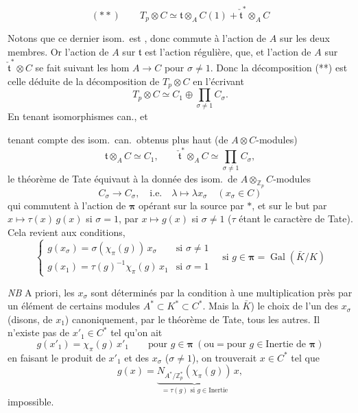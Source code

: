 \documentclass[11pt,a4paper]{article}
\begin{document}
\[
(**) \qquad T_p \otimes C \simeq \mathfrak{t} \otimes_A C(1) + \check{\mathfrak{t}}^{*} \otimes_A C
\]

Notons que ce dernier isom.\ est , donc commute à
l'action de $A$ sur les deux membres. Or l'action de $A$ sur $\mathfrak{t}$
est l'action régulière,  \ill{} \ill{} que, et l'action de
$A$ sur $\check{\mathfrak{t}}^{*} \otimes C$ se fait suivant les hom
$A \to C$ pour $\sigma \neq 1$. Donc la décomposition (**) est celle
déduite de la décomposition de $T_p \otimes C$ \struck{\ill{} \ill{}} en
l'écrivant
\[
T_p \otimes C \simeq C_1 \oplus \prod_{\sigma \neq 1} C_\sigma .
\]
 En tenant   isomorphismes
can., et


tenant compte des isom.\ can.\ obtenus plus haut (de $A \otimes C$-modules)
\[
\mathfrak{t} \otimes_A C \simeq C_1, \qquad
\check{\mathfrak{t}}^{*} \otimes_A C \simeq \prod_{\sigma \neq 1} C_\sigma,
\]
 le théorème de Tate équivaut à la donnée des
isom.\ de $A \otimes_{\mathbb{Z}_p} C$-modules
\[
C_\sigma \to C_\sigma, \quad \text{i.e.} \quad \lambda \mapsto \lambda x_\sigma \quad (x_\sigma \in C)
\]
qui commutent à l'action de $\boldsymbol{\pi}$ opérant sur la source par
$*$, et sur le but par $x \mapsto \tau(x)\, g(x)$ si $\sigma = 1$, par
$x \mapsto g(x)$ si $\sigma \neq 1$ ($\tau$ étant le caractère de Tate).
Cela revient aux conditions,
\[
\boxed{\ \begin{cases}
g(x_\sigma) = \sigma(\chi_\pi(g))\, x_\sigma & \text{si } \sigma \neq 1 \\
g(x_1) = \tau(g)^{-1} \chi_\pi(g)\, x_1 & \text{si } \sigma = 1
\end{cases}
\quad \text{si } g \in \boldsymbol{\pi} = \operatorname{Gal}(\bar{K}/K)\ }
\]

\emph{NB} A priori, les $x_\sigma$ sont déterminés par la condition à une
multiplication près par un élément de certains modules $A^* \subset K^*
\subset C^*$. Mais la \ill{}  \ill{} \ill{} \ill{}
$\bar{K}$) le choix de l'un des $x_\sigma$ (disons, de $x_1$)
 canoniquement, par le théorème de Tate, tous les
autres. \struck{\ill{}} Il n'existe pas de $x'_1 \in C^*$ tel qu'on ait
\[
g(x'_1) = \chi_\pi(g)\, x'_1 \qquad \text{pour } g \in \boldsymbol{\pi}
\ (\text{ou} = \text{pour } g \in \text{Inertie de } \boldsymbol{\pi})
\]
 en faisant le produit de $x'_1$ et des $x_\sigma$
($\sigma \neq 1$), on trouverait $x \in C^*$ tel que
\[
g(x) = \underbrace{N_{A^*/\mathbb{Z}_p^*}(\chi_\pi(g))}_{= \tau(g) \text{ si } g \in \text{Inertie}}\, x ,
\]
impossible.
\end{document}
